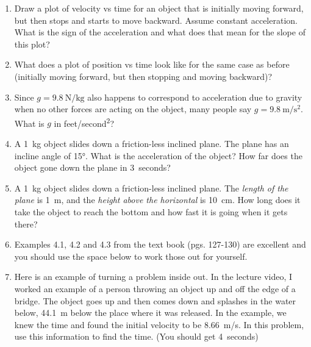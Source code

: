 \begin{enumerate}

\item 
Draw a plot of velocity vs time for an object that is initially moving forward, but then stops and starts to move backward. Assume constant acceleration. What is the sign of the acceleration and what does that mean for the slope of this plot?\bigskip

\item What does a plot of position vs time look like for the same case as before (initially moving forward, but then stopping and moving backward)?\bigskip

\item Since $g=\SI{9.8}{\newton/\kilogram}$ also happens to correspond to acceleration due to gravity when no other forces are acting on the object, many people say $g=\SI{9.8}{\meter/\second^2}$. What is $g$ in \si{feet/second^2}?

\item A \SI{1}{kg} object slides down a friction-less inclined plane. The plane has an incline angle of \ang{15}. What is the acceleration of the object? How far does the object gone down the plane in \SI{3}{seconds}?\bigskip

\item A \SI{1}{kg} object slides down a friction-less inclined plane. The \emph{length of the plane} is \SI{1}{\meter}, and the \emph{height above the horizontal} is \SI{10}{\centi\meter}. How long does it take the object to reach the bottom and how fast it is going when it gets there?\bigskip

\clearpage
\item Examples 4.1, 4.2 and 4.3 from the text book (pgs. 127-130) are excellent and you should use the space below to work those out for yourself.
\clearpage

\item Here is an example of turning a problem inside out. In the lecture video, I worked an example of a person throwing an object up and off the edge of a bridge. The object goes up and then comes down and splashes in the water below, \SI{44.1}{\meter} below the place where it was released. In the example, we knew the time and found the initial velocity to be \SI{+8.66}{\meter / \second}. In this problem, use this information to find the time. (You should get \SI{4}{seconds})


\end{enumerate}
